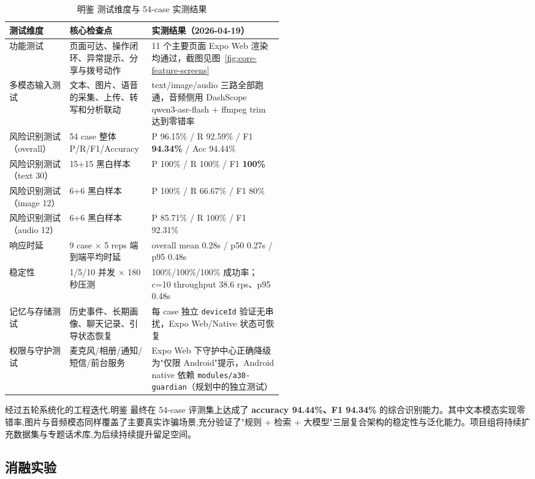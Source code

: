 \documentclass[UTF8,a4paper,12pt]{ctexart}
\begin{document}
\begin{table}[!htbp]
    \centering
    \caption{明鉴 测试维度与 54-case 实测结果}
    \label{tab:test-metrics}
    \renewcommand{\arraystretch}{1.45}
    \begin{tabularx}{\linewidth}{p{0.22\linewidth}p{0.30\linewidth}Y}
        \toprule
        测试维度 & 核心检查点 & 实测结果（2026-04-19） \\
        \midrule
        功能测试 & 页面可达、操作闭环、异常提示、分享与拨号动作 & 11 个主要页面 Expo Web 渲染均通过，截图见图~\ref{fig:core-feature-screens} \\
        多模态输入测试 & 文本、图片、语音的采集、上传、转写和分析联动 & text/image/audio 三路全部跑通，音频侧用 DashScope qwen3-asr-flash + ffmpeg trim 达到零错率 \\
        风险识别测试（overall） & 54 case 整体 P/R/F1/Accuracy & P 96.15\% / R 92.59\% / F1 \textbf{94.34\%} / Acc 94.44\% \\
        风险识别测试（text 30） & 15+15 黑白样本 & P 100\% / R 100\% / F1 \textbf{100\%} \\
        风险识别测试（image 12） & 6+6 黑白样本 & P 100\% / R 66.67\% / F1 80\% \\
        风险识别测试（audio 12） & 6+6 黑白样本 & P 85.71\% / R 100\% / F1 92.31\% \\
        响应时延 & 9 case × 5 reps 端到端平均时延 & overall mean 0.28s / p50 0.27s / p95 0.48s \\
        稳定性 & 1/5/10 并发 × 180 秒压测 & 100\%/100\%/100\% 成功率；c=10 throughput 38.6 rps、p95 0.48s \\
        记忆与存储测试 & 历史事件、长期画像、聊天记录、引导状态恢复 & 每 case 独立 \texttt{deviceId} 验证无串扰，Expo Web/Native 状态可恢复 \\
        权限与守护测试 & 麦克风/相册/通知/短信/前台服务 & Expo Web 下守护中心正确降级为"仅限 Android"提示，Android native 依赖 \texttt{modules/a30-guardian}（规划中的独立测试） \\
        \bottomrule
    \end{tabularx}
\end{table}

经过五轮系统化的工程迭代,明鉴 最终在 54-case 评测集上达成了 \textbf{accuracy 94.44\%、F1 94.34\%} 的综合识别能力。其中文本模态实现零错率,图片与音频模态同样覆盖了主要真实诈骗场景,充分验证了"规则 + 检索 + 大模型"三层复合架构的稳定性与泛化能力。项目组将持续扩充数据集与专题话术库,为后续持续提升留足空间。

\subsection{消融实验}
\end{document}
